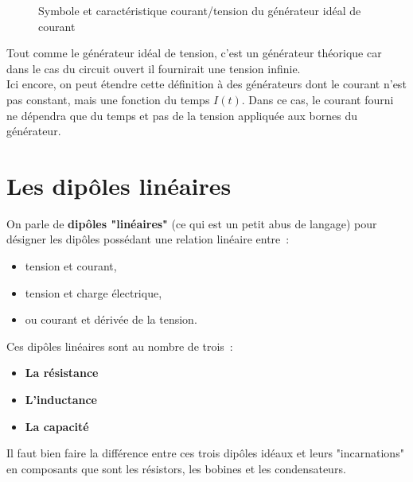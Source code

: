 \begin{figure}[!h]
\begin{center}

\hspace{1cm}

\end{center}
\caption{ Symbole et caractéristique courant/tension du générateur idéal de courant}
\end{figure}

Tout comme le générateur idéal de tension, c'est un générateur théorique car dans le cas du circuit ouvert il fournirait une tension infinie.\\

Ici encore, on peut étendre cette définition à des générateurs dont le courant n'est pas constant, mais une fonction du temps $I(t)$. Dans ce cas, le courant fourni ne dépendra que du temps et pas de la tension appliquée aux bornes du générateur.


\section{ Les dipôles linéaires }

On parle de \textbf{dipôles "linéaires"} (ce qui est un petit abus de langage) pour désigner les dipôles possédant une relation linéaire entre~:\\
\begin{itemize}
\item tension et courant, 
\item tension et charge électrique,
\item ou courant et dérivée de la tension.\\
\end{itemize}

Ces dipôles linéaires sont au nombre de trois~: \\

\begin{itemize}
\item \textbf{La résistance}
\item \textbf{L'inductance}
\item \textbf{La capacité} \\
\end{itemize}

Il faut bien faire la différence entre ces trois dipôles idéaux et leurs "incarnations" en composants que sont les résistors, les bobines et les condensateurs. \\

